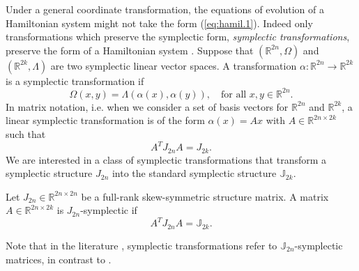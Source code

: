 Under a general coordinate transformation, the equations of evolution of a Hamiltonian system might not take the form (\ref{eq:hamil.1}). Indeed only transformations which preserve the symplectic form, \emph{symplectic transformations}, preserve the form of a Hamiltonian system \cite{Hairer:1250576}. Suppose that $(\mathbb R^{2n},\Omega)$ and $(\mathbb R^{2k},\Lambda)$ are two symplectic linear vector spaces. A transformation $\alpha:\mathbb R^{2n}\to\mathbb R^{2k}$ is a symplectic transformation if
\begin{equation} \label{eq:hamil.3}
	\Omega(x,y) = \Lambda(\alpha(x),\alpha(y)), \quad \text{for all } x,y\in\mathbb R^{2n}.
\end{equation}
In matrix notation, i.e. when we consider a set of basis vectors for $\mathbb R^{2n}$ and $\mathbb R^{2k}$, a linear symplectic transformation is of the form $\alpha(x) = Ax$ with $A\in \mathbb R^{2n\times 2k}$ such that
\begin{equation} \label{eq:hamil.4}
	A^T J_{2n} A = J_{2k}.
\end{equation}
We are interested in a class of symplectic transformations that transform a symplectic structure $J_{2n}$ into the standard symplectic structure $\mathbb J_{2k}$.
\begin{definition} \label{def:symp-mat}
Let $J_{2n}\in \mathbb R^{2n\times 2n}$ be a full-rank skew-symmetric structure matrix. A matrix $A\in\mathbb R^{2n\times 2k}$ is $J_{2n}$-symplectic if
\begin{equation} \label{eq:hamil.5}
A^T J_{2n} A = \mathbb{J}_{2k}.
\end{equation}
\end{definition}
Note that in the literature \cite{Marsden:2010:IMS:1965128,Hairer:1250576}, symplectic transformations refer to $\mathbb{J}_{2n}$-symplectic matrices, in contrast to .

